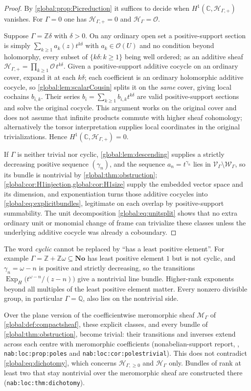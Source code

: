 \documentclass[11pt,letterpaper]{article}
\theoremstyle{definition}
\theoremstyle{remark}
\newcommand{\No}{\mathbf{No}}
\newcommand{\C}{\mathbb C}
\newcommand{\Z}{\mathbb Z}
\newcommand{\Q}{\mathbb Q}
\newcommand{\OO}{\mathcal O}
\newcommand{\HH}{\mathscr H_\Gamma}
\newcommand{\HP}{\mathscr H_{\Gamma,+}}
\newcommand{\HI}{\mathscr H_{\Gamma,\ge0}}
\newcommand{\ExpH}{\operatorname{Exp}_{H}}
\newcommand{\MG}{\mathscr M_\Gamma}
\numberwithin{equation}{section}
\begin{document}
\begin{proof}
By \cref{global:prop:Picreduction} it suffices to decide when $H^1(\C,\HP)$ vanishes. For $\Gamma=0$ one has $\HP=0$ and $\HH=\OO$.

Suppose $\Gamma=\Z\delta$ with $\delta>0$. On any ordinary open set a positive-support section is simply $\sum_{k\ge1}a_k(z)t^{k\delta}$ with $a_k\in\OO(U)$ and no condition beyond holomorphy, every subset of $\{k\delta:k\ge1\}$ being well ordered; as an additive sheaf $\HP=\prod_{k\ge1}\OO\,t^{k\delta}$. Given a positive-support additive cocycle on an ordinary cover, expand it at each $k\delta$; each coefficient is an ordinary holomorphic additive cocycle, so \cref{global:lem:scalarCousin} splits it on the \emph{same} cover, giving local cochains $b_{i,k}$. Their series $b_i=\sum_{k\ge1}b_{i,k}t^{k\delta}$ are valid positive-support sections and solve the original cocycle. This argument works on the original cover and does not assume that infinite products commute with higher sheaf cohomology; alternatively the torsor interpretation supplies local coordinates in the original trivializations. Hence $H^1(\C,\HP)=0$.

If $\Gamma$ is neither trivial nor cyclic, \cref{global:lem:descending} supplies a strictly decreasing positive sequence $(\gamma_n)$, and the sequence $a_n=t^{\gamma_n}$ lies in $\mathcal V_\Gamma\setminus\mathcal W_\Gamma$, so its bundle is nontrivial by \cref{global:thm:obstruction}; \cref{global:cor:H1injection,global:cor:H1size} supply the embedded vector space and its dimension, and exponentiation turns those additive cocycles into \eqref{global:eq:explicitbundles}, legitimate on each overlap by positive-support summability. The unit decomposition \eqref{global:eq:unitsplit} shows that no extra ordinary unit or monomial change of frame can trivialize these classes unless the underlying additive cocycle was already a coboundary.
\end{proof}

The word \emph{cyclic} cannot be replaced by ``has a least positive element''. For example $\Gamma=\Z+\Z\omega\subseteq\No$ has least positive element $1$ but is not cyclic, and $\gamma_n=\omega-n$ is positive and strictly decreasing, so the transitions $\ExpH\bigl(t^{\omega-n}/(z-n)\bigr)$ give a nontrivial line bundle. Higher-rank exponents beyond all multiples of the least positive element matter. Every nonzero divisible group, in particular $\Gamma=\Q$, also lies on the nontrivial side.

Over the plane version of the coefficientwise meromorphic sheaf $\MG$ of \cref{global:def:compactsheaf}, these explicit classes, and every bundle of \cref{global:thm:obstruction}, become trivial: their transitions and inverses extend across each centre with meromorphic coefficients (nonabelian-support report, , \texttt{nab:loc:prop:poles} and \texttt{nab:loc:cor:polestrivial}). This does not contradict \eqref{global:eq:dichotomy}, which concerns $\HI$ and $\HH$ only. Bundles of rank at least two that stay nontrivial over the meromorphic sheaf are constructed there (\texttt{nab:loc:thm:dichotomy}).
\end{document}
